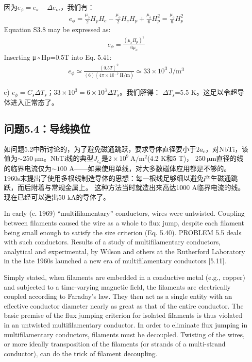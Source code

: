 因为$e_\phi=e_s-\Delta e_m$，我们有：
\begin{align*}%
e_{\phi}=\frac{\mu_{o}}{2}H_{p}H_{e}-\frac{\mu_{o}}{2}H_{e}H_{p}+\frac{\mu_{o}}{6}H_{p}^{2}=\frac{\mu_{o}}{6}H_{p}^{2}\tag{S3.8}
\end{align*}
Equation S3.8 may be expressed as:
\begin{align*}%
e_{\phi}=\frac{(\mu_{o}H_{p})^{2}}{6\mu_{o}}\tag{5.41}
\end{align*}
Inserting μ◦Hp=0.5T into Eq. 5.41:
\begin{align*}%
e_{\phi}\simeq\frac{(0.5T)^{2}}{(6)(4\pi\times10^{-7}\ \mathrm{H/m})}\simeq33\times10^{3}\ \mathrm{J/m^{3}}
\end{align*}

c) $e_\phi = C_s \Delta T_s；33\times 10^3= 6\times 10^3 \Delta T_s$。我们解得：
$\Delta T_s$=5.5 K。这足以令超导体进入正常态了。


\subsection{问题5.4：导线换位}
如问题5.2中所讨论的，为了避免磁通跳跃，要求导体直径要小于$2a_c$，对NbTi，该值为$\sim 250\ \mathrm{\mu m}$。NbTi线的典型$J_{c_o}$是$2\times 10^9\ \mathrm{A/m^2}$(4.2 K和5 T)，
$250\ \mathrm{\mu m}$直径的线的临界电流仅为$\sim 100$ A——如果使用单线，对大多数磁体应用都是不够的。
1960s末提出了使用多根线制造导体的思想：每一根线足够细以避免产生磁通跳跃，而后附着与常规金属上。
这种方法当时就造出来高达1000 A临界电流的线。现在已经可以造出50 kA的导体了。

In early (c. 1969) “multifilamentary” conductors, wires were untwisted. Coupling
between filaments caused the wire as a whole to flux jump, despite each filament
being small enough to satisfy the size criterion (Eq. 5.40). PROBLEM 5.5 deals
with such conductors. Results of a study of multifilamentary conductors, analytical
and experimental, by Wilson and others at the Rutherford Laboratory in the late
1960s launched a new era of multifilamentary conductors [5.11].

Simply stated, when filaments are embedded in a conductive metal (e.g., copper)
and subjected to a time-varying magnetic field, the filaments are electrically coupled
according to Faraday’s law. They then act as a single entity with an effective
conductor diameter nearly as great as that of the entire conductor. The basic
premise of the flux jumping criterion for isolated filaments is thus violated in an
untwisted multifilamentary conductor. In order to eliminate flux jumping in multifilamentary
conductors, filaments must be decoupled. Twisting of the wires, or
more ideally transposition of the filaments (or strands of a multi-strand conductor),
can do the trick of filament decoupling.


